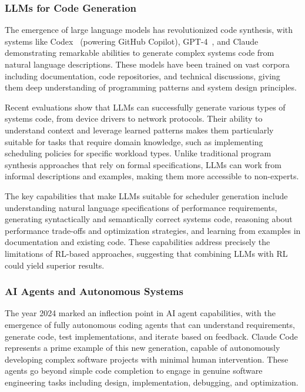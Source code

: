\subsubsection{LLMs for Code Generation}

The emergence of large language models has revolutionized code synthesis, with systems like Codex~\cite{chen2021codex} (powering GitHub Copilot), GPT-4~\cite{openai2023gpt4}, and Claude~\cite{anthropic2024claude} demonstrating remarkable abilities to generate complex systems code from natural language descriptions. These models have been trained on vast corpora including documentation, code repositories, and technical discussions, giving them deep understanding of programming patterns and system design principles.

Recent evaluations show that LLMs can successfully generate various types of systems code, from device drivers to network protocols. Their ability to understand context and leverage learned patterns makes them particularly suitable for tasks that require domain knowledge, such as implementing scheduling policies for specific workload types. Unlike traditional program synthesis approaches that rely on formal specifications, LLMs can work from informal descriptions and examples, making them more accessible to non-experts.

The key capabilities that make LLMs suitable for scheduler generation include understanding natural language specifications of performance requirements, generating syntactically and semantically correct systems code, reasoning about performance trade-offs and optimization strategies, and learning from examples in documentation and existing code. These capabilities address precisely the limitations of RL-based approaches, suggesting that combining LLMs with RL could yield superior results.

\subsubsection{AI Agents and Autonomous Systems}

The year 2024 marked an inflection point in AI agent capabilities, with the emergence of fully autonomous coding agents that can understand requirements, generate code, test implementations, and iterate based on feedback. Claude Code represents a prime example of this new generation, capable of autonomously developing complex software projects with minimal human intervention. These agents go beyond simple code completion to engage in genuine software engineering tasks including design, implementation, debugging, and optimization.

